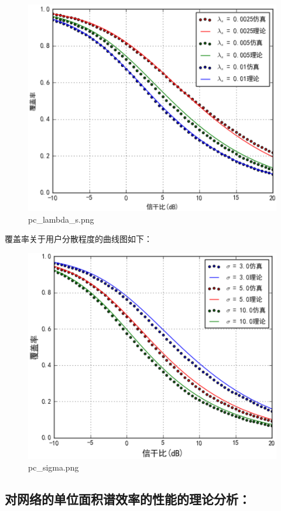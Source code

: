 \documentclass[11pt]{article}
\makeatletter
\def\maxwidth{\ifdim\Gin@nat@width>\linewidth\linewidth
    \else\Gin@nat@width\fi}
\let\Oldincludegraphics\includegraphics
\renewcommand{\includegraphics}[1]{\Oldincludegraphics[width=.8\maxwidth]{#1}}
\makeatother
\begin{document}
\begin{figure}[htbp]
\centering
\includegraphics{pc_lambda_s.png}
\caption{pc\_lambda\_s.png}
\end{figure}

覆盖率关于用户分散程度的曲线图如下：

\begin{figure}[htbp]
\centering
\includegraphics{pc_sigma.png}
\caption{pc\_sigma.png}
\end{figure}

    \subsection{对网络的单位面积谱效率的性能的理论分析：}\label{ux5bf9ux7f51ux7edcux7684ux5355ux4f4dux9762ux79efux8c31ux6548ux7387ux7684ux6027ux80fdux7684ux7406ux8bbaux5206ux6790}
\end{document}

